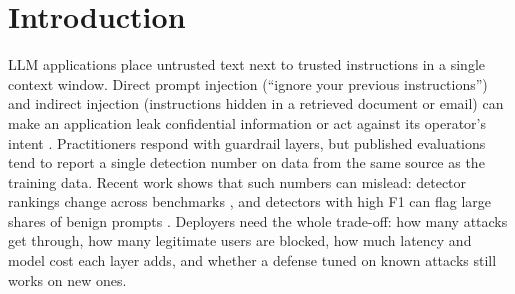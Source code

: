 \documentclass[11pt]{article}
\begin{document}
\section{Introduction}
LLM applications place untrusted text next to trusted instructions in a single context window. Direct prompt
injection (``ignore your previous instructions'') and indirect injection (instructions hidden in a retrieved
document or email) can make an application leak confidential information or act against its operator's intent
\cite{perez2022ignore,greshake2023not,liu2023prompt}. Practitioners respond with guardrail layers, but published
evaluations tend to report a single detection number on data from the same source as the training data.
Recent work shows that such numbers can mislead: detector rankings change across benchmarks
\cite{liu2026passing,fomin2026benchmarks,akinrele2026regime}, and detectors with high F1 can flag large shares of
benign prompts \cite{shire2026pids,li2024injecguard}. Deployers need the whole trade-off: how many attacks get
through, how many legitimate users are blocked, how much latency and model cost each layer adds, and whether a
defense tuned on known attacks still works on new ones.
\end{document}
